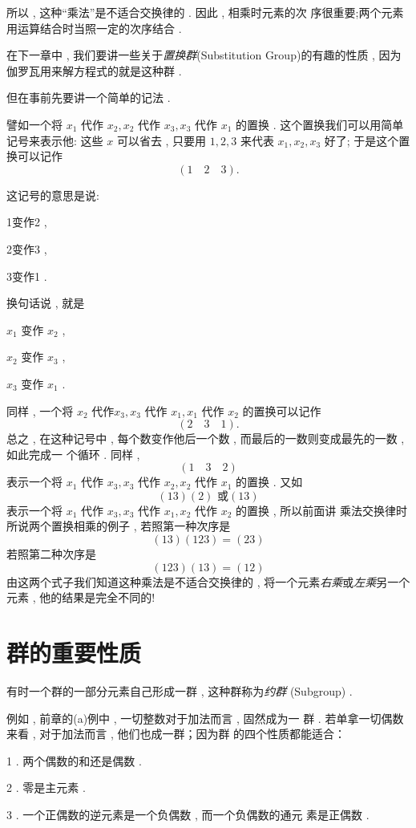 所以 , 这种“乘法”是不适合交换律的 . 因此 , 相乘时元素的次 序很重要;两个元素用运算结合时当照一定的次序结合 . 

在下一章中 , 我们要讲一些关于\emph{置换群}(Substitution Group)的有趣的性质 , 因为伽罗瓦用来解方程式的就是这种群 . 

但在事前先要讲一个简单的记法 . 

譬如一个将 $x_{1}$ 代作 $x_{2} ,  x_{2}$ 代作 $x_{3} ,  x_{3}$ 代作 $x_{1}$ 的置换 . 这个置换我们可以用简单记号来表示他: 这些 $x$ 可以省去 ,  只要用 $1 , 2 , 3$ 来代表 $x_{1} ,  x_{2} ,  x_{3}$ 好了; 于是这个置换可以记作
\[(1 \quad 2 \quad 3)  . \]

这记号的意思是说:

1变作2 , 

2变作3 , 

3变作1 . 

换句话说 , 就是

$x_{1}$ 变作 $x_{2}$ , 

$x_{2}$ 变作 $x_{3}$ , 

$x_{3}$ 变作 $x_{1}$ . 

同样 , 一个将 $x_{2}$ 代作$x_{3} ,  x_{3}$ 代作 $x_{1} ,  x_{1}$ 代作
$x_{2}$ 的置换可以记作
\[(2\quad 3 \quad 1)  . \]
总之 , 在这种记号中 , 每个数变作他后一个数 , 而最后的一数则变成最先的一数 , 如此完成一
个循环 . 同样 , 
\[(1 \quad 3 \quad 2) \]
表示一个将 $x_{1}$ 代作 $x_{3} ,  x_{3}$ 代作 $x_{2} ,  x_{2}$ 代作 $x_{1}$ 的置换 . 又如
\[
(13)(2) \text { 或} (13)
\]
表示一个将 $x_{1}$ 代作 $x_{3} ,  x_{3}$ 代作 $x_{1} ,  x_{2}$ 代作 $x_{2}$ 的置换 , 所以前面讲 乘法交换律时所说两个置换相乘的例子 , 若照第一种次序是
\[
(13)(123)=(23)
\]
若照第二种次序是
\[
(123)(13)=(12)
\]
由这两个式子我们知道这种乘法是不适合交换律的 , 将一个元素\emph{右乘}或\emph{左乘}另一个元素 , 他的结果是完全不同的!

\section{群的重要性质}

有时一个群的一部分元素自己形成一群 , 这种群称为\emph{约群} (Subgroup) . 

例如 , 前章的(a)例中 , 一切整数对于加法而言 , 固然成为一 群 . 若单拿一切偶数来看 , 对于加法而言 , 他们也成一群；因为群 的四个性质都能适合：

1 . 两个偶数的和还是偶数 . 

2 . 零是主元素 . 

3 . 一个正偶数的逆元素是一个负偶数 , 而一个负偶数的通元 素是正偶数 . 

